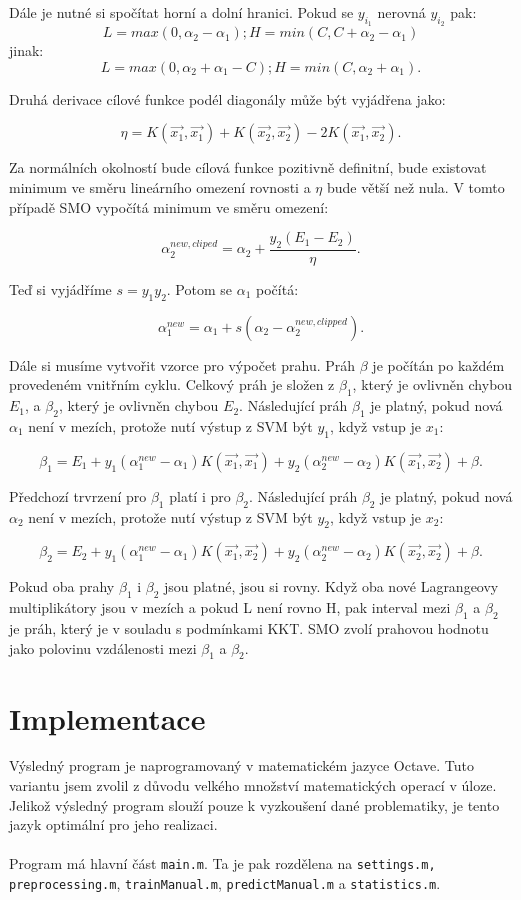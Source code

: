 \documentclass[a4]{article}
\begin{document}
\noindent Dále je nutné si spočítat horní a dolní hranici. Pokud se $y_{i_1}$ nerovná $y_{i_2}$ pak:
$$
L=max(0,\alpha_2 - \alpha_1) ; H=min(C, C+\alpha_2 - \alpha_1)
$$
jinak:
$$
L=max(0,\alpha_2 + \alpha_1 - C) ; H=min(C, \alpha_2 + \alpha_1).
$$

\noindent Druhá derivace cílové funkce podél diagonály může být vyjádřena jako:

$$
\eta=K(\vec{x_1},\vec{x_1}) + K(\vec{x_2},\vec{x_2}) -2K(\vec{x_1},\vec{x_2}).
$$

\noindent Za normálních okolností bude cílová funkce pozitivně definitní, bude existovat
minimum ve směru lineárního omezení rovnosti a $\eta$ bude větší než nula. V
tomto případě SMO vypočítá minimum ve směru omezení:

$$
\alpha_{2}^{new,cliped} = \alpha_{2}+\frac{y_{2}(E_{1}-E_{2})}{\eta}.
$$

\noindent Teď si vyjádříme $s=y_{1}y_{2}$. Potom se $\alpha_1$ počítá:

$$
\alpha_{1}^{new}=\alpha_{1}+s(\alpha_{2}-\alpha_{2}^{new,clipped}).
$$

\noindent Dále si musíme vytvořit vzorce pro výpočet prahu. Práh $\beta$ je počítán po každém provedeném vnitřním cyklu. Celkový práh je složen z $\beta_1$, který  je ovlivněn chybou $E_1$, a $\beta_2$, který je ovlivněn chybou $E_2$. Následující práh $\beta_1$ je platný, pokud nová $\alpha_{1}$ není v mezích, protože nutí výstup z SVM být $y_1$, když vstup je $x_1$:

$$
\beta_1=E_1+y_1(\alpha_1^{new}-\alpha_{1})K(\vec{x_1},\vec{x_1})+y_2(\alpha_2^{new}-\alpha_2)K(\vec{x_1},\vec{x_2})+\beta.
$$

\noindent Předchozí trvrzení pro $\beta_1$ platí i pro $\beta_2$. Následující práh $\beta_2$ je platný, pokud nová $\alpha_{2}$ není v mezích, protože nutí výstup z SVM být $y_2$, když vstup je $x_2$:

$$
\beta_2=E_2+y_1(\alpha_1^{new}-\alpha_{1})K(\vec{x_1},\vec{x_2})+y_2(\alpha_2^{new}-\alpha_2)K(\vec{x_2},\vec{x_2})+\beta.
$$

\noindent Pokud oba prahy $\beta_1$ i $\beta_2$ jsou platné, jsou si rovny. Když oba nové Lagrangeovy multiplikátory jsou v mezích a pokud L není rovno H, pak interval mezi $\beta_1$ a $\beta_2$ je práh, který je v souladu s podmínkami KKT. SMO zvolí prahovou hodnotu jako polovinu vzdálenosti mezi $\beta_1$ a $\beta_2$.\cite{smo_platt_original}

\section{Implementace}
Výsledný program je naprogramovaný v matematickém jazyce Octave. Tuto variantu jsem zvolil z důvodu velkého množství matematických operací v úloze. Jelikož výsledný program slouží pouze k vyzkoušení dané problematiky, je tento jazyk optimální pro jeho realizaci.
\\\\
Program má hlavní část \texttt{main.m}. Ta je pak rozdělena na \texttt{settings.m, preprocessing.m}, \texttt{trainManual.m}, \texttt{predictManual.m} a \texttt{statistics.m}.
\end{document}
